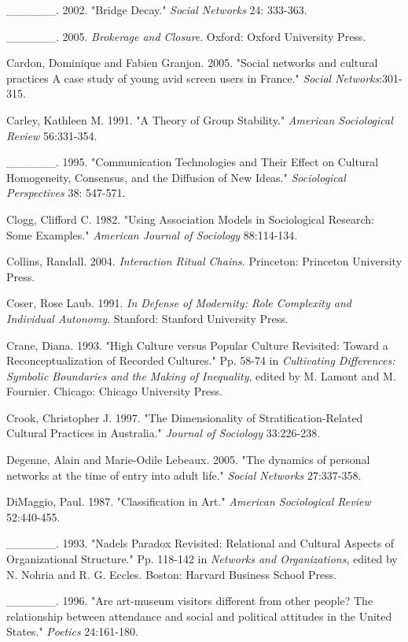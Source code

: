 \_\_\_\_\_\_. 2002. "Bridge Decay." \emph{Social Networks} 24: 333-363.

\_\_\_\_\_\_. 2005. \emph{Brokerage and Closure}. Oxford: Oxford University Press.

Cardon, Dominique and Fabien Granjon. 2005. "Social networks and cultural practices A case study of young avid screen users in France." \emph{Social Networks}:301-315.

Carley, Kathleen M. 1991. "A Theory of Group Stability." \emph{American Sociological Review} 56:331-354.

\_\_\_\_\_\_. 1995. "Communication Technologies and Their Effect on Cultural Homogeneity, Consensus, and the Diffusion of New Ideas." \emph{Sociological Perspectives} 38: 547-571.

Clogg, Clifford C. 1982. "Using Association Models in Sociological Research: Some Examples." \emph{American Journal of Sociology} 88:114-134.

Collins, Randall. 2004. \emph{Interaction Ritual Chains}. Princeton: Princeton University Press.

Coser, Rose Laub. 1991. \emph{In Defense of Modernity: Role Complexity and Individual Autonomy}. Stanford: Stanford University Press.

Crane, Diana. 1993. "High Culture versus Popular Culture Revisited: Toward a Reconceptualization of Recorded Cultures." Pp. 58-74 in \emph{Cultivating Differences: Symbolic Boundaries and the Making of Inequality}, edited by M. Lamont and M. Fournier. Chicago: Chicago University Press.

Crook, Christopher J. 1997. "The Dimensionality of Stratification-Related Cultural Practices in Australia." \emph{Journal of Sociology} 33:226-238.

Degenne, Alain and Marie-Odile Lebeaux. 2005. "The dynamics of personal networks at the time of entry into adult life." \emph{Social Networks} 27:337-358.

DiMaggio, Paul. 1987. "Classification in Art." \emph{American Sociological Review} 52:440-455.

\_\_\_\_\_\_. 1993. "Nadel\textquotesingle s Paradox Revisited: Relational and Cultural Aspects of Organizational Structure." Pp. 118-142 in \emph{Networks and Organizations}, edited by N. Nohria and R. G. Eccles. Boston: Harvard Business School Press.

\_\_\_\_\_\_. 1996. "Are art-museum visitors different from other people? The relationship between attendance and social and political attitudes in the United States." \emph{Poetics} 24:161-180.

